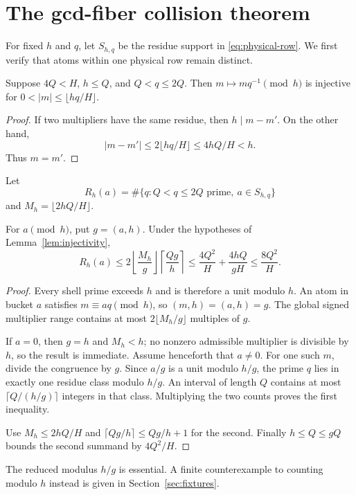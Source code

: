 \section{The gcd-fiber collision theorem}

For fixed $h$ and $q$, let $S_{h,q}$ be the residue support in
\eqref{eq:physical-row}.  We first verify that atoms within one physical row remain
distinct.

\begin{lemma}\label{lem:injectivity}
Suppose $4Q<H$, $h\le Q$, and $Q<q\le2Q$.  Then
$m\mapsto mq^{-1}\pmod h$ is injective for
$0<|m|\le\lfloor hq/H\rfloor$.
\end{lemma}

\begin{proof}
If two multipliers have the same residue, then $h\mid m-m'$.  On the other hand,
\[
 |m-m'|\le2\lfloor hq/H\rfloor\le4hQ/H<h.
\]
Thus $m=m'$.
\end{proof}

Let
\[
 R_h(a)=\#\{q:Q<q\le2Q\text{ prime},\ a\in S_{h,q}\}
\]
and $M_h=\lfloor2hQ/H\rfloor$.

\begin{theorem}\label{thm:gcd-envelope}
For $a\pmod h$, put $g=(a,h)$.  Under the hypotheses of
Lemma~\ref{lem:injectivity},
\begin{equation}
 R_h(a)
 \le2\left\lfloor\frac{M_h}{g}\right\rfloor
       \left\lceil\frac{Qg}{h}\right\rceil
 \le\frac{4Q^2}{H}+\frac{4hQ}{gH}
 \le\frac{8Q^2}{H}.                                  \label{eq:multiplicity}
\end{equation}
\end{theorem}

\begin{proof}
Every shell prime exceeds $h$ and is therefore a unit modulo $h$.  An atom in bucket
$a$ satisfies $m\equiv aq\pmod h$, so
$(m,h)=(a,h)=g$.  The global signed multiplier range contains at most
$2\lfloor M_h/g\rfloor$ multiples of $g$.

If $a=0$, then $g=h$ and $M_h<h$; no nonzero admissible multiplier is divisible by
$h$, so the result is immediate.  Assume henceforth that $a\ne0$.
For one such $m$, divide the congruence by $g$.  Since $a/g$ is a unit modulo $h/g$,
the prime $q$ lies in exactly one residue class modulo $h/g$.  An interval of length
$Q$ contains at most $\lceil Q/(h/g)\rceil$ integers in that class.  Multiplying the
two counts proves the first inequality.

Use $M_h\le2hQ/H$ and $\lceil Qg/h\rceil\le Qg/h+1$ for the second.  Finally
$h\le Q\le gQ$ bounds the second summand by $4Q^2/H$.
\end{proof}

The reduced modulus $h/g$ is essential.  A finite counterexample to counting modulo
$h$ instead is given in Section~\ref{sec:fixtures}.
